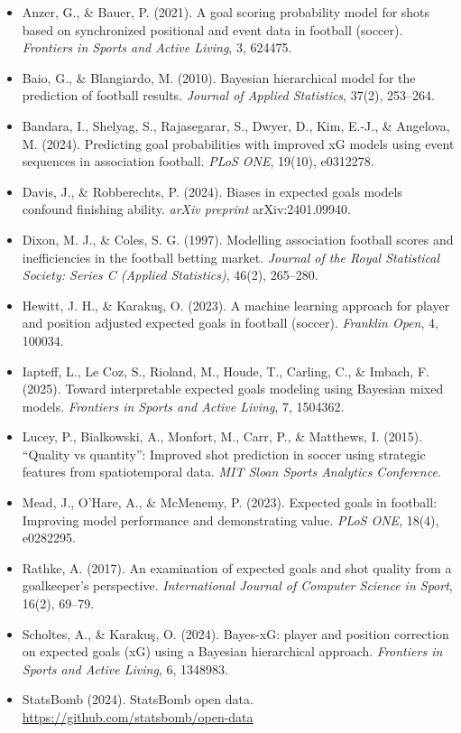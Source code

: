 \documentclass[11pt]{article}
\begin{document}
\begin{itemize}[leftmargin=1.6em,itemsep=4pt]
  \item Anzer, G., \& Bauer, P. (2021). A goal scoring probability model for
        shots based on synchronized positional and event data in football
        (soccer). \textit{Frontiers in Sports and Active Living}, 3, 624475.
  \item Baio, G., \& Blangiardo, M. (2010). Bayesian hierarchical model for the
        prediction of football results. \textit{Journal of Applied Statistics},
        37(2), 253--264.
  \item Bandara, I., Shelyag, S., Rajasegarar, S., Dwyer, D., Kim, E.-J., \&
        Angelova, M. (2024). Predicting goal probabilities with improved xG
        models using event sequences in association football. \textit{PLoS ONE},
        19(10), e0312278.
  \item Davis, J., \& Robberechts, P. (2024). Biases in expected goals models
        confound finishing ability. \textit{arXiv preprint} arXiv:2401.09940.
  \item Dixon, M. J., \& Coles, S. G. (1997). Modelling association football
        scores and inefficiencies in the football betting market. \textit{Journal
        of the Royal Statistical Society: Series C (Applied Statistics)}, 46(2),
        265--280.
  \item Hewitt, J. H., \& Karaku\c{s}, O. (2023). A machine learning approach for
        player and position adjusted expected goals in football (soccer).
        \textit{Franklin Open}, 4, 100034.
  \item Iapteff, L., Le Coz, S., Rioland, M., Houde, T., Carling, C., \& Imbach,
        F. (2025). Toward interpretable expected goals modeling using Bayesian
        mixed models. \textit{Frontiers in Sports and Active Living}, 7, 1504362.
  \item Lucey, P., Bialkowski, A., Monfort, M., Carr, P., \& Matthews, I. (2015).
        ``Quality vs quantity'': Improved shot prediction in soccer using
        strategic features from spatiotemporal data. \textit{MIT Sloan Sports
        Analytics Conference}.
  \item Mead, J., O'Hare, A., \& McMenemy, P. (2023). Expected goals in football:
        Improving model performance and demonstrating value. \textit{PLoS ONE},
        18(4), e0282295.
  \item Rathke, A. (2017). An examination of expected goals and shot quality from
        a goalkeeper's perspective. \textit{International Journal of Computer
        Science in Sport}, 16(2), 69--79.
  \item Scholtes, A., \& Karaku\c{s}, O. (2024). Bayes-xG: player and position
        correction on expected goals (xG) using a Bayesian hierarchical approach.
        \textit{Frontiers in Sports and Active Living}, 6, 1348983.
  \item StatsBomb (2024). StatsBomb open data.
        \url{https://github.com/statsbomb/open-data}
\end{itemize}
\end{document}
